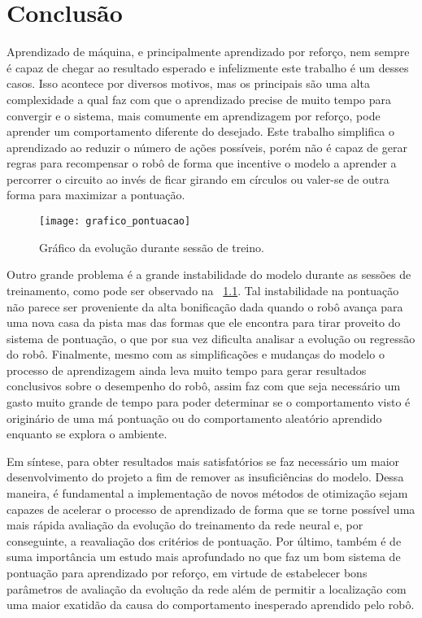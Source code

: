 

\chapter{Conclusão}
\label{cap:conclusao}

Aprendizado de máquina, e principalmente aprendizado por reforço, nem sempre é capaz de chegar ao resultado esperado e infelizmente este trabalho é um desses casos. Isso acontece por diversos motivos, mas os principais são uma alta complexidade a qual faz com que o aprendizado precise de muito tempo para convergir e o sistema, mais comumente em aprendizagem por reforço, pode aprender um comportamento diferente do desejado. Este trabalho simplifica o aprendizado ao reduzir o número de ações possíveis, porém não é capaz de gerar regras para recompensar o robô de forma que incentive o modelo a aprender a percorrer o circuito ao invés de ficar girando em círculos ou valer-se de outra forma para maximizar a pontuação.

\begin{figure}
	\centering
	\texttt{[image: grafico\_pontuacao]}
	\caption{Gráfico da evolução durante sessão de treino. \label{fig:grafico_pontuacao}}
\end{figure}

Outro grande problema é a grande instabilidade do modelo durante as sessões de treinamento, como pode ser observado na ~\ref{fig:grafico_pontuacao}. Tal instabilidade na pontuação não parece ser proveniente da alta bonificação dada quando o robô avança para uma nova casa da pista mas das formas que ele encontra para tirar proveito do sistema de pontuação, o que por sua vez dificulta analisar a evolução ou regressão do robô. Finalmente, mesmo com as simplificações e mudanças do modelo o processo de aprendizagem ainda leva muito tempo para gerar resultados conclusivos sobre o desempenho do robô, assim faz com que seja necessário um gasto muito grande de tempo para poder determinar se o comportamento visto é originário de uma má pontuação ou do comportamento aleatório aprendido enquanto se explora o ambiente.

Em síntese, para obter resultados mais satisfatórios se faz necessário um maior desenvolvimento do projeto a fim de remover as insuficiências do modelo. Dessa maneira, é fundamental a implementação de novos métodos de otimização sejam capazes de acelerar o processo de aprendizado de forma que se torne possível uma mais rápida avaliação da evolução do treinamento da rede neural e, por conseguinte, a reavaliação dos critérios de pontuação. Por último, também é de suma importância um estudo mais aprofundado no que faz um bom sistema de pontuação para aprendizado por reforço, em virtude de estabelecer bons parâmetros de avaliação da evolução da rede além de permitir a localização com uma maior exatidão da causa do comportamento inesperado aprendido pelo robô.
